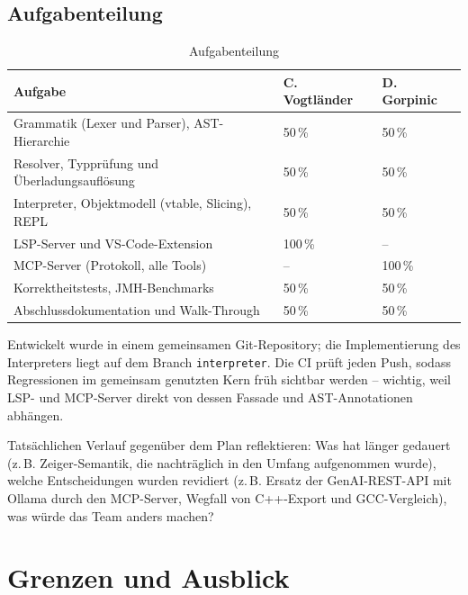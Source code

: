 \documentclass[11pt,a4paper,parskip=half,headsepline,toc=flat]{scrartcl}
\newcommand{\code}[1]{\texttt{#1}}
\newcommand{\thead}{\rowcolor{headbg}}
\newcommand{\hcell}[1]{\textbf{\color{navy}#1}}
\newenvironment{reporttable}[1][]%
  {\begin{table}[htbp]\centering\small\renewcommand{\arraystretch}{1.25}\rowcolors{2}{white}{zebra}}%
  {\end{table}}
\begin{document}
\subsection{Aufgabenteilung}
\begin{reporttable}
\begin{tabular}{L{0.56}L{0.17}L{0.17}}
\thead \hcell{Aufgabe} & \hcell{C. Vogtländer} & \hcell{D. Gorpinic} \\ \midrule
Grammatik (Lexer und Parser), AST-Hierarchie & 50\,\% & 50\,\% \\
Resolver, Typprüfung und Überladungsauflösung & 50\,\% & 50\,\% \\
Interpreter, Objektmodell (vtable, Slicing), REPL & 50\,\% & 50\,\% \\
LSP-Server und VS-Code-Extension & 100\,\% & -- \\
MCP-Server (Protokoll, alle Tools) & -- & 100\,\% \\
Korrektheitstests, JMH-Benchmarks & 50\,\% & 50\,\% \\
Abschlussdokumentation und Walk-Through & 50\,\% & 50\,\% \\ \bottomrule
\end{tabular}
\caption{Aufgabenteilung}
\end{reporttable}

Entwickelt wurde in einem gemeinsamen Git-Repository; die Implementierung des Interpreters liegt auf dem Branch
\code{interpreter}. Die CI prüft jeden Push, sodass Regressionen im gemeinsam genutzten Kern früh sichtbar werden --
wichtig, weil LSP- und MCP-Server direkt von dessen Fassade und AST-Annotationen abhängen.

\begin{todo}
Tatsächlichen Verlauf gegenüber dem Plan reflektieren: Was hat länger gedauert (z.\,B. Zeiger-Semantik, die
nachträglich in den Umfang aufgenommen wurde), welche Entscheidungen wurden revidiert (z.\,B. Ersatz der
GenAI-REST-API mit Ollama durch den MCP-Server, Wegfall von C++-Export und GCC-Vergleich), was würde das Team anders
machen?
\end{todo}

\section{Grenzen und Ausblick}\label{sec:ausblick}
\end{document}
